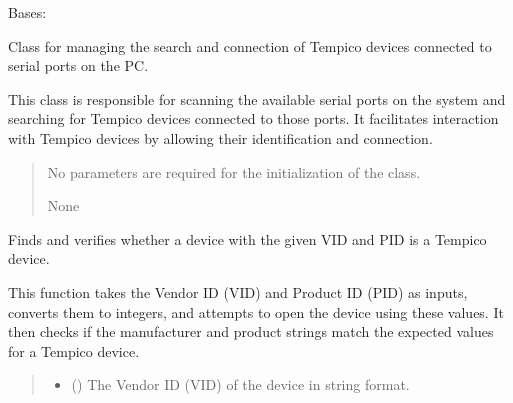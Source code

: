 \documentclass[letterpaper,10pt,english]{sphinxmanual}
\begin{document}
\begin{fulllineitems}
\label{\detokenize{findDevices:findDevices.PyTempicoManager}}
\pysigstartsignatures
{}
\pysigstopsignatures
\sphinxAtStartPar
Bases: 

\sphinxAtStartPar
Class for managing the search and connection of Tempico devices connected to serial ports on the PC.

\sphinxAtStartPar
This class is responsible for scanning the available serial ports on the system and searching for Tempico devices 
connected to those ports. It facilitates interaction with Tempico devices by allowing their identification and connection.
\begin{quote}\begin{description}
\sphinxAtStartPar
{} \textendash{} No parameters are required for the initialization of the class.

\sphinxAtStartPar
None

\end{description}\end{quote}

\begin{fulllineitems}
\label{\detokenize{findDevices:findDevices.PyTempicoManager.find_devices}}
\pysigstartsignatures
{}
\pysigstopsignatures
\sphinxAtStartPar
Finds and verifies whether a device with the given VID and PID is a Tempico device.

\sphinxAtStartPar
This function takes the Vendor ID (VID) and Product ID (PID) as inputs, converts them to integers, 
and attempts to open the device using these values. It then checks if the manufacturer and product 
strings match the expected values for a Tempico device.
\begin{quote}\begin{description}
\begin{itemize}
\item {} 
\sphinxAtStartPar
{} () \textendash{} The Vendor ID (VID) of the device in string format.


\end{itemize}
\end{description}
\end{quote}
\end{fulllineitems}
\end{fulllineitems}
\end{document}
